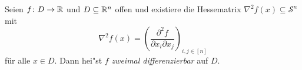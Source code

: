 %
\begin{Definition}
\label{def:2diffability}
  Seien $f\colon D\to\mathbb R$ und $D\subseteq\mathbb R^n$ offen und existiere die Hessematrix $\nabla^2 f(x)\subseteq\mathcal{S}^n$ mit
  \begin{equation*}
    \nabla^2 f(x) = \left( \frac{\partial^2 f}{\partial x_i \partial x_j} \right)_{i, j \in [n]}
  \end{equation*}
  \noindent
  f\"ur alle $x \in D$.
  Dann hei"st $f$ \emph{zweimal differenzierbar} auf $D$.
\end{Definition}